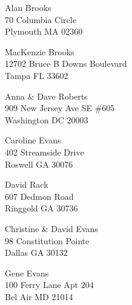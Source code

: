 \documentclass{article}
\begin{document}
\begin{center}
\begin{Huge}
\clearpage

\vspace*{\fill}
Alan Brooks\\
70 Columbia Circle\\
Plymouth MA 02360\\
\vspace{\fill}

\clearpage

\vspace*{\fill}
MacKenzie Brooks\\
12702 Bruce B Downs Boulevard\\
Tampa FL 33602\\
\vspace{\fill}

\clearpage

\vspace*{\fill}
Anna \& Dave Roberts\\
909 New Jersey Ave SE \#605\\
Washington DC 20003\\
\vspace{\fill}

\clearpage

\vspace*{\fill}
Caroline Evans\\
402 Streamside Drive\\
Roswell GA 30076\\
\vspace{\fill}

\clearpage

\vspace*{\fill}
David Rack\\
607 Dedmon Road\\
Ringgold GA 30736\\
\vspace{\fill}

\clearpage

\vspace*{\fill}
Christine \& David Evans\\
98 Constitution Pointe\\
Dallas GA 30132\\
\vspace{\fill}

\clearpage

\vspace*{\fill}
Gene Evans\\
100 Ferry Lane Apt 204\\
Bel Air MD 21014\\
\vspace{\fill}


\end{Huge}
\end{center}
\end{document}
